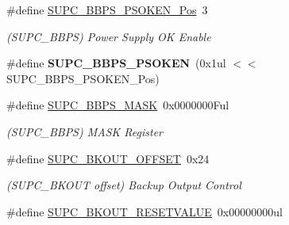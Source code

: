 \begin{DoxyCompactItemize}
\item 
\hypertarget{group___s_a_m_l21___s_u_p_c_gacb0ebec01640923bffde668998d02c7f}{}\#define \hyperlink{group___s_a_m_l21___s_u_p_c_gacb0ebec01640923bffde668998d02c7f}{S\+U\+P\+C\+\_\+\+B\+B\+P\+S\+\_\+\+P\+S\+O\+K\+E\+N\+\_\+\+Pos}~3\label{group___s_a_m_l21___s_u_p_c_gacb0ebec01640923bffde668998d02c7f}

\begin{DoxyCompactList}\small\item\em (S\+U\+P\+C\+\_\+\+B\+B\+P\+S) Power Supply O\+K Enable \end{DoxyCompactList}\item 
\hypertarget{group___s_a_m_l21___s_u_p_c_ga495f3a0577239702c956a142169a41a7}{}\#define {\bfseries S\+U\+P\+C\+\_\+\+B\+B\+P\+S\+\_\+\+P\+S\+O\+K\+E\+N}~(0x1ul $<$$<$ S\+U\+P\+C\+\_\+\+B\+B\+P\+S\+\_\+\+P\+S\+O\+K\+E\+N\+\_\+\+Pos)\label{group___s_a_m_l21___s_u_p_c_ga495f3a0577239702c956a142169a41a7}

\item 
\hypertarget{group___s_a_m_l21___s_u_p_c_ga1fe35d1f68d52aeddb77d4d7a6ac33d0}{}\#define \hyperlink{group___s_a_m_l21___s_u_p_c_ga1fe35d1f68d52aeddb77d4d7a6ac33d0}{S\+U\+P\+C\+\_\+\+B\+B\+P\+S\+\_\+\+M\+A\+S\+K}~0x0000000\+Ful\label{group___s_a_m_l21___s_u_p_c_ga1fe35d1f68d52aeddb77d4d7a6ac33d0}

\begin{DoxyCompactList}\small\item\em (S\+U\+P\+C\+\_\+\+B\+B\+P\+S) M\+A\+S\+K Register \end{DoxyCompactList}\item 
\hypertarget{group___s_a_m_l21___s_u_p_c_gacabb137b25d157dfcb4e0712f19c83b2}{}\#define \hyperlink{group___s_a_m_l21___s_u_p_c_gacabb137b25d157dfcb4e0712f19c83b2}{S\+U\+P\+C\+\_\+\+B\+K\+O\+U\+T\+\_\+\+O\+F\+F\+S\+E\+T}~0x24\label{group___s_a_m_l21___s_u_p_c_gacabb137b25d157dfcb4e0712f19c83b2}

\begin{DoxyCompactList}\small\item\em (S\+U\+P\+C\+\_\+\+B\+K\+O\+U\+T offset) Backup Output Control \end{DoxyCompactList}\item 
\hypertarget{group___s_a_m_l21___s_u_p_c_gae9509091226d1b8669c9f6eaef1f51bb}{}\#define \hyperlink{group___s_a_m_l21___s_u_p_c_gae9509091226d1b8669c9f6eaef1f51bb}{S\+U\+P\+C\+\_\+\+B\+K\+O\+U\+T\+\_\+\+R\+E\+S\+E\+T\+V\+A\+L\+U\+E}~0x00000000ul\label{group___s_a_m_l21___s_u_p_c_gae9509091226d1b8669c9f6eaef1f51bb}


\end{DoxyCompactItemize}
